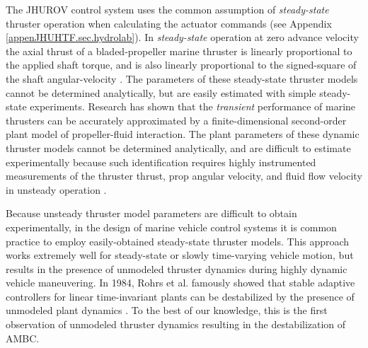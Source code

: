 The \ac{JHUROV} control system uses the common assumption of {\it
steady-state} thruster operation when calculating the actuator
commands (see Appendix \ref{appenJHUHTF.sec.hydrolab}).
%
In {\it steady-state} operation at zero advance velocity the axial
thrust of a bladed-propeller marine thruster is linearly proportional
to the applied shaft torque, and is also linearly proportional to the
signed-square of the shaft angular-velocity
\cite{pona.book}.  
%
The parameters of these steady-state thruster models
cannot be determined analytically, but are easily estimated with
simple steady-state experiments.
%
Research has shown that the {\it transient} performance of marine
thrusters can be accurately approximated by a finite-dimensional
second-order plant model of propeller-fluid interaction.
%
The plant parameters of these dynamic thruster models cannot be
determined analytically, and are difficult to estimate experimentally
because such identification requires highly instrumented measurements
of the thruster thrust, prop angular velocity, and fluid flow velocity
in unsteady operation
\cite{yoerger.oe90,healey.joe95,bachmayer&whitcomb&grosenbaugh.joe2000,kim2006accurate}.


Because unsteady thruster model parameters are difficult to obtain
experimentally, in the design of marine vehicle control systems it is
common practice to employ easily-obtained steady-state thruster models.
%
This approach works extremely well for steady-state or slowly
time-varying vehicle motion, but results in the presence of unmodeled 
thruster dynamics during highly dynamic vehicle maneuvering.
%
In 1984, Rohrs et al. famously showed that stable adaptive controllers
for linear time-invariant plants can be destabilized by the presence
of unmodeled plant dynamics \cite{rohrs.1984}. %
%
To the best of our knowledge, this is the first observation of
unmodeled thruster dynamics resulting in the destabilization of
\ac{AMBC}. %
